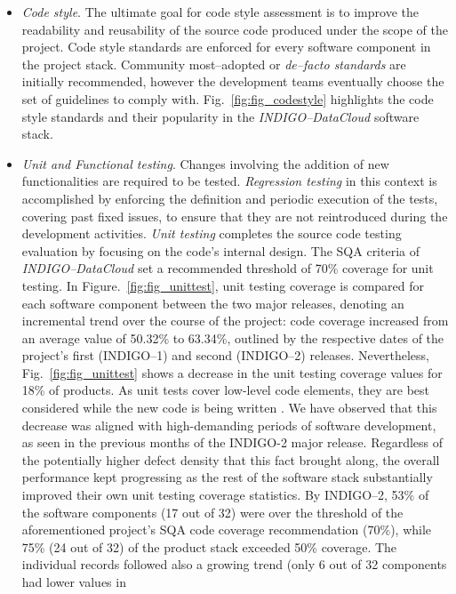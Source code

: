\begin{itemize}
\item \textit{Code style}.
The ultimate goal for code style assessment is to improve the readability and reusability of the
source code produced under the scope of the
project. Code style standards are enforced for every software component in the project stack. Community
most--adopted or \textit{de--facto standards} are initially recommended, however the development teams eventually
choose the set of guidelines to comply with. Fig.~\ref{fig:fig_codestyle} highlights the code style standards and
their popularity
in the {\sl INDIGO--DataCloud} software stack.

\item \textit{Unit and Functional testing}.
Changes involving the addition of new functionalities are required to be tested. \textit{Regression
testing} in this context is accomplished by enforcing the definition and periodic execution
of the tests, covering past fixed issues, to ensure that they are not reintroduced during the development
activities. \textit{Unit testing} completes the source code testing evaluation by focusing on the code's
internal design. The SQA criteria of {\sl INDIGO--DataCloud} set a recommended threshold of 70\% coverage
for unit testing. In Figure.~\ref{fig:fig_unittest}, unit testing coverage is compared for each software
component between the two major releases, denoting an incremental trend over the course of the project:
code coverage increased from an average value of 50.32\% to 63.34\%, outlined by the respective dates of
the project's first (INDIGO--1) and second (INDIGO--2) releases. Nevertheless, Fig.~\ref{fig:fig_unittest}
shows a decrease in the unit testing coverage values for 18\% of products. As unit tests cover low-level
code elements, they are best considered while the new code is being written \cite{unit-test-frameworks}.
We have observed that this decrease was aligned with high-demanding periods of software development, as
seen in the previous months of the INDIGO-2 major release. Regardless of the potentially higher defect
density that this fact brought along, the overall performance kept progressing as the rest of the software
stack substantially improved their own unit testing coverage statistics. By INDIGO--2, 53\% of the software
components (17 out of 32) were over the threshold of the aforementioned project's SQA code coverage
recommendation (70\%), while 75\% (24 out of 32) of the product stack exceeded 50\% coverage.
The individual records followed also a growing trend (only 6 out of 32 components had lower values in

\end{itemize}
